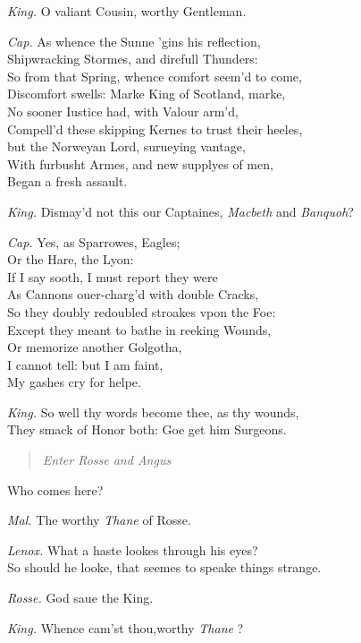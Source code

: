 \documentclass[12pt]{sides}
\newcommand{\StageDir}[1]{\begin{quote}\centering\em #1\end{quote}}
\newcommand{\dia}[1]{\hskip 15pt\textit{#1}\hskip 6pt}
\begin{document}
\begin{multicols}{2}
			\dia{King.} O valiant Cousin, worthy Gentleman.
			
			\dia{Cap.} As whence the Sunne 'gins his reflection, \\ Shipwracking Stormes, and direfull Thunders: \\ So from that Spring, whence comfort seem'd to come, \\ Discomfort swells: Marke King of Scotland, marke, \\ No sooner Iustice had, with Valour arm'd, \\ Compell'd these skipping Kernes to trust their heeles, \\ but the Norweyan Lord, surueying vantage, \\ With furbusht Armes, and new supplyes of men, \\ Began a fresh assault.
			
			\dia{King.} Dismay'd not this our Captaines, \textit{Macbeth} and \textit{Banquoh}?
			
			\dia{Cap.} Yes, as Sparrowes, Eagles; \\ Or the Hare, the Lyon: \\ If I say sooth, I must report they were \\ As Cannons ouer-charg'd with double Cracks, \\ So they doubly redoubled stroakes vpon the Foe: \\ Except they meant to bathe in reeking Wounds, \\ Or memorize another Golgotha, \\ I cannot tell: but I am faint, \\ My gashes cry for helpe.
			
			\dia{King.} So well thy words become thee, as thy wounds, \\ They smack of Honor both: Goe get him Surgeons.
			
			\StageDir{Enter Rosse and Angus}
			Who comes here?
			
			\dia{Mal.} The worthy \textit{Thane} of Rosse.
			 
			\dia{Lenox.} What a haste lookes through his eyes? \\ So should he looke, that seemes to speake things strange.
			
			\dia{Rosse.} God saue the King.
			
			\dia{King.} Whence cam'st thou,worthy \textit{Thane} ?
			

\end{multicols}
\end{document}
